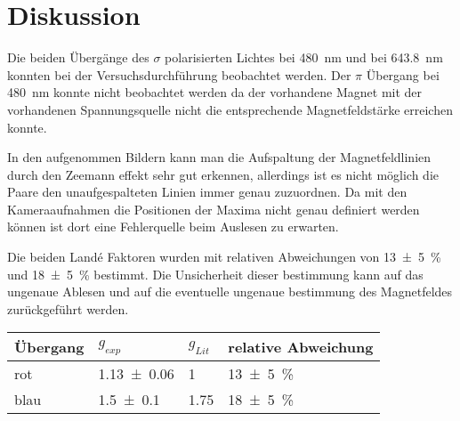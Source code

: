 \newpage
\section{Diskussion}
\label{sec:diskussion}
Die beiden Übergänge des $\sigma$ polarisierten Lichtes bei \SI{480}{\nano\metre} und bei \SI{643,8}{\nano\metre} konnten bei der Versuchsdurchführung beobachtet werden.
Der $\pi$ Übergang bei \SI{480}{\nano\metre} konnte nicht beobachtet werden da der vorhandene Magnet mit der vorhandenen Spannungsquelle nicht die entsprechende Magnetfeldstärke erreichen konnte.

In den aufgenommen Bildern kann man die Aufspaltung der Magnetfeldlinien durch den Zeemann effekt sehr gut erkennen, allerdings ist es nicht möglich die Paare den unaufgespalteten Linien immer genau zuzuordnen.
Da mit den Kameraaufnahmen die Positionen der Maxima nicht genau definiert werden können ist dort eine Fehlerquelle beim Auslesen zu erwarten.

Die beiden Landé Faktoren wurden mit relativen Abweichungen von \SI{13+-5}{\percent} und \SI{18+-5}{\percent} bestimmt.
Die Unsicherheit dieser bestimmung kann auf das ungenaue Ablesen und auf die eventuelle ungenaue bestimmung des Magnetfeldes zurückgeführt werden.
\vspace{2cm}

\centering
\begin{tabular}[h]{|l|l|l|l|}
    \hline
    Übergang & $g_{exp}$ & $g_{Lit}$ & relative Abweichung\\
    \hline
    rot & \num{1.13+-0.06} & \num{1} & \SI{13+-5}{\percent}\\
    blau & \num{1.5+-0.1} & \num{1.75} & \SI{18+-5}{\percent}\\
    \hline
\end{tabular}